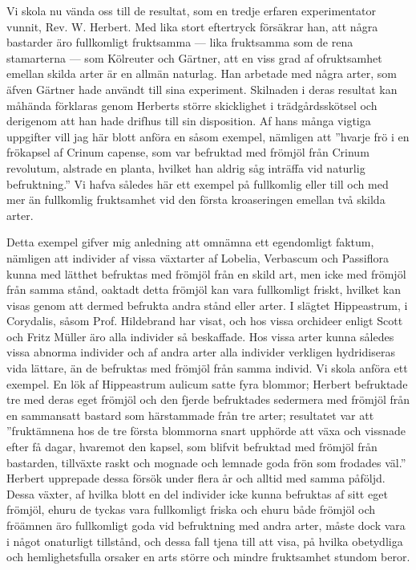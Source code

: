Vi skola nu vända oss till de resultat, som en tredje erfaren experimentator vunnit, Rev. W. Herbert. Med lika stort eftertryck försäkrar han, att några bastarder äro fullkomligt fruktsamma — lika fruktsamma som de rena stamarterna — som Kölreuter och Gärtner, att en viss grad af ofruktsamhet emellan skilda arter är en allmän naturlag. Han arbetade med några arter, som äfven Gärtner hade användt till sina experiment. Skilnaden i deras resultat kan måhända förklaras genom Herberts större skicklighet i trädgårdsskötsel och derigenom att han hade drifhus till sin disposition. Af hans många vigtiga uppgifter vill jag här blott anföra en såsom exempel, nämligen att ”hvarje frö i en frökapsel af Crinum capense, som var befruktad med frömjöl från Crinum revolutum, alstrade en planta, hvilket han aldrig såg inträffa vid naturlig befruktning.” Vi hafva således här ett exempel på fullkomlig eller till och med mer än fullkomlig fruktsamhet vid den första kroaseringen emellan två skilda arter.

Detta exempel gifver mig anledning att omnämna ett egendomligt faktum, nämligen att individer af vissa växtarter af Lobelia, Verbascum och Passiflora kunna med lätthet befruktas med frömjöl från en skild art, men icke med frömjöl från samma stånd, oaktadt detta frömjöl kan vara fullkomligt friskt, hvilket kan visas genom att dermed befrukta andra stånd eller arter. I slägtet Hippeastrum, i Corydalis, såsom Prof. Hildebrand har visat, och hos vissa orchideer enligt Scott och Fritz Müller äro alla individer så beskaffade. Hos vissa arter kunna således vissa abnorma individer och af andra arter alla individer verkligen hydridiseras vida lättare, än de befruktas med frömjöl från samma individ. Vi skola anföra ett exempel. En lök af Hippeastrum aulicum satte fyra blommor; Herbert befruktade tre med deras eget frömjöl och den fjerde befruktades sedermera med frömjöl från en sammansatt bastard som härstammade från tre arter; resultatet var att ”fruktämnena hos de tre första blommorna snart upphörde att växa och vissnade efter få dagar, hvaremot den kapsel, som blifvit befruktad med frömjöl från bastarden, tillväxte raskt och mognade och lemnade goda frön som frodades väl.” Herbert upprepade dessa försök under flera år och alltid med samma påföljd. Dessa växter, af hvilka blott en del individer icke kunna befruktas af sitt eget frömjöl, ehuru de tyckas vara fullkomligt friska och ehuru både frömjöl och fröämnen äro fullkomligt goda vid befruktning med andra arter, måste dock vara i något onaturligt tillstånd, och dessa fall tjena till att visa, på hvilka obetydliga och hemlighetsfulla orsaker en arts större och mindre fruktsamhet stundom beror.

